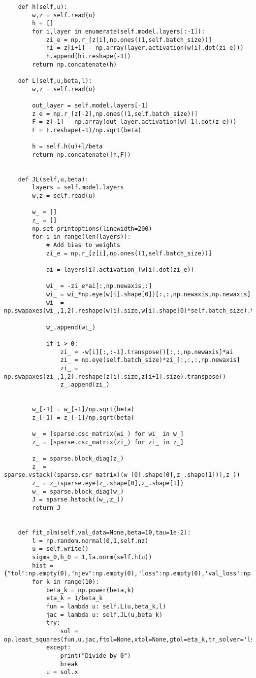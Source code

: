 \begin{verbatim}
    def h(self,u):
        w,z = self.read(u)
        h = []
        for i,layer in enumerate(self.model.layers[:-1]):
            zi_e = np.r_[z[i],np.ones((1,self.batch_size))]
            hi = z[i+1] - np.array(layer.activation(w[i].dot(zi_e)))
            h.append(hi.reshape(-1))
        return np.concatenate(h)

    def L(self,u,beta,l):
        w,z = self.read(u)
        
        out_layer = self.model.layers[-1]
        z_e = np.r_[z[-2],np.ones((1,self.batch_size))]
        F = z[-1] - np.array(out_layer.activation(w[-1].dot(z_e)))
        F = F.reshape(-1)/np.sqrt(beta)

        h = self.h(u)+l/beta
        return np.concatenate([h,F])

        
    def JL(self,u,beta):
        layers = self.model.layers
        w,z = self.read(u)

        w_ = []
        z_ = []
        np.set_printoptions(linewidth=200)
        for i in range(len(layers)):
            # Add bias to weights
            zi_e = np.r_[z[i],np.ones((1,self.batch_size))]

            ai = layers[i].activation_(w[i].dot(zi_e))

            wi_ = -zi_e*ai[:,np.newaxis,:]
            wi_ = wi_*np.eye(w[i].shape[0])[:,:,np.newaxis,np.newaxis]
            wi_ = np.swapaxes(wi_,1,2).reshape(w[i].size,w[i].shape[0]*self.batch_size).transpose()

            w_.append(wi_)

            if i > 0:
                zi_ = -w[i][:,:-1].transpose()[:,:,np.newaxis]*ai
                zi_ = np.eye(self.batch_size)*zi_[:,:,:,np.newaxis]
                zi_ = np.swapaxes(zi_,1,2).reshape(z[i].size,z[i+1].size).transpose()
                z_.append(zi_)

        
        w_[-1] = w_[-1]/np.sqrt(beta)
        z_[-1] = z_[-1]/np.sqrt(beta)

        w_ = [sparse.csc_matrix(wi_) for wi_ in w_]
        z_ = [sparse.csc_matrix(zi_) for zi_ in z_]
        
        z_ = sparse.block_diag(z_)
        z_ = sparse.vstack((sparse.csr_matrix((w_[0].shape[0],z_.shape[1])),z_))
        z_ = z_+sparse.eye(z_.shape[0],z_.shape[1])
        w_ = sparse.block_diag(w_)
        J = sparse.hstack((w_,z_))
        return J
            

    def fit_alm(self,val_data=None,beta=10,tau=1e-2):
        l = np.random.normal(0,1,self.nz)
        u = self.write()
        sigma_0,h_0 = 1,la.norm(self.h(u))
        hist = {"tol":np.empty(0),"njev":np.empty(0),"loss":np.empty(0),'val_loss':np.empty(0)}
        for k in range(10):
            beta_k = np.power(beta,k)
            eta_k = 1/beta_k
            fun = lambda u: self.L(u,beta_k,l)
            jac = lambda u: self.JL(u,beta_k)
            try:
                sol = op.least_squares(fun,u,jac,ftol=None,xtol=None,gtol=eta_k,tr_solver='lsmr')
            except:
                print("Divide by 0")
                break
            u = sol.x


\end{verbatim}
